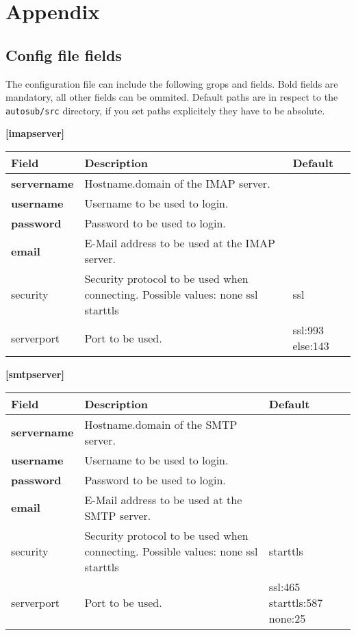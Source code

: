 \section{Appendix} \label{appendix}

\subsection{Config file fields} \label{app:config}
The configuration file can include the following grops and fields. Bold fields
are mandatory, all other fields can be ommited. Default paths are in respect to
the {\tt autosub/src} directory, if you set paths explicitely they have to be absolute.

{\bf [imapserver]}\\
\begin{tabular}{|p{2.5cm}|p{8cm}|p{2.5cm}|}
\hline
{\bf Field} & {\bf Description} & {\bf Default}\\
\hline
\hline
\textbf{servername} & Hostname.domain of the IMAP server. & ~\\
\hline
\textbf{username} & Username to be used to login. & ~ \\
\hline
\textbf{password} & Password to be used to login. & ~ \\
\hline
\textbf{email} & E-Mail address to be used at the IMAP server. & ~ \\
\hline
security & Security protocol to be used when connecting.
    Possible values: none ssl starttls & ssl \\
\hline
serverport & Port to be used. & ssl:993 else:143\\
\hline
\end{tabular}


{\bf [smtpserver]}\\
\begin{tabular}{|p{2.5cm}|p{8cm}|p{2.5cm}|}
\hline
{\bf Field} & {\bf Description} & {\bf Default}\\
\hline
\hline
\textbf{servername} & Hostname.domain of the SMTP server. & ~ \\
\hline
\textbf{username }& Username to be used to login. & ~ \\
\hline
\textbf{password} & Password to be used to login. & ~ \\
\hline
\textbf{email} & E-Mail address to be used at the SMTP server. & ~ \\
\hline
security & Security protocol to be used when connecting.
    Possible values: none ssl starttls & starttls\\
\hline
serverport & Port to be used. & ssl:465 starttls:587 none:25 \\
\hline
\end{tabular}

